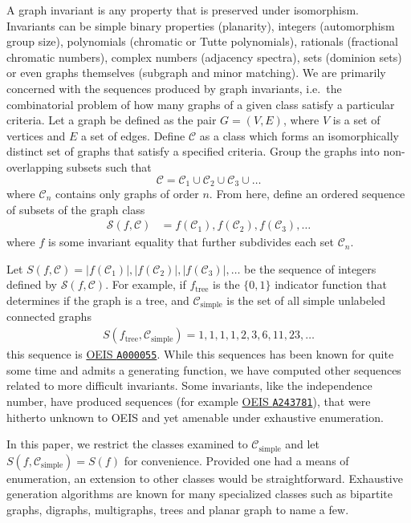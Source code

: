 \documentclass[12pt]{article}
\newcommand{\note}[1]{\todo[inline,size=\tiny]{#1}}
\newcommand{\OEIS}[1]
{\href{https://oeis.org/#1}{OEIS \texttt{#1}}}
\newcommand{\SEQ}{\mathcal{S}}
\newcommand{\CLASS}{\mathcal{C}}
\newcommand{\SIMPLECLASS}{\mathcal{C}_\text{simple}}
\newcommand{\ie}[0]{i.e.\ }
\begin{document}
A graph invariant is any property that is preserved under isomorphism. 
Invariants can be simple binary properties (planarity), integers (automorphism group size), polynomials (chromatic or Tutte polynomials), rationals (fractional chromatic numbers), complex numbers (adjacency spectra), sets (dominion sets) or even graphs themselves (subgraph and minor matching).
We are primarily concerned with the sequences produced by graph invariants, \ie the combinatorial problem of how many graphs of a given class satisfy a particular criteria.
Let a graph be defined as the pair $G = (V,E)$, where $V$ is a set of vertices and $E$ a set of edges. 
Define $\CLASS$ as a class which forms an isomorphically distinct set of graphs that satisfy a specified criteria.
Group the graphs into non-overlapping subsets such that
\begin{equation}
\CLASS = \CLASS_1 \cup \CLASS_2 \cup \CLASS_3 \cup \ldots
\end{equation}
where $\CLASS_n$ contains only graphs of order $n$.
From here, define an ordered sequence of subsets of the graph class
%
\begin{align}
\SEQ(f, \CLASS) 
&= f(\CLASS_1), f(\CLASS_2), f(\CLASS_3), \ldots
\end{align}
%
where $f$ is some invariant equality that further subdivides each set $\CLASS_n$.

Let 
$S(f, \CLASS) = |f(\CLASS_1)|, |f(\CLASS_2)|, |f(\CLASS_3)|, \ldots$
be the sequence of integers defined by $\SEQ(f, \CLASS)$. For example, if $f_\text{tree}$ is the $\{0,1\}$ indicator function that determines if the graph is a tree, and $\SIMPLECLASS$ is the set of all simple unlabeled connected graphs
%
\begin{align}
S(f_\text{tree}, \SIMPLECLASS) = 1, 1, 1, 1, 2, 3, 6, 11, 23, \ldots
\end{align}
%
this sequence is \OEIS{A000055}. 
While this sequences has been known for quite some time and admits a generating function, we have computed other sequences related to more difficult invariants.
Some invariants, like the independence number, have produced sequences (for example \OEIS{A243781}), that were hitherto unknown to OEIS and yet amenable under exhaustive enumeration.

In this paper, we restrict the classes examined to $\SIMPLECLASS$ and let $S(f,\SIMPLECLASS)=S(f)$ for convenience. 
Provided one had a means of enumeration, an extension to other classes would be straightforward.
Exhaustive generation algorithms are known for many specialized classes such as bipartite graphs, digraphs, multigraphs, trees and planar graph to name a few. \note{REF}
\end{document}
